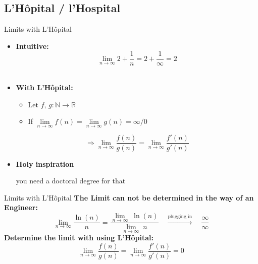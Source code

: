 \subsection{L'H\^{o}pital / l'Hospital}

\begin{frame}{Limits with L'H\^{o}pital}
  \begin{itemize}
    \item
      \textbf{Intuitive:}\\
      \begin{displaymath}
        \lim\limits_{n \rightarrow \infty} 2 + \dfrac{1}{n}
        = 2  + \dfrac{1}{\infty} = 2
      \end{displaymath}
      \vspace{0em}\\
    \item<2- |handout:1>
      \textbf{With L'H\^{o}pital:}
      \begin{itemize}
        \item
          Let $f, \, g : \mathbb{N} \rightarrow \mathbb{R}$
        \item
          If
          \begin{math}
            \lim\limits_{n \to \infty} f(n)
              = \lim\limits_{n \to \infty} g(n)
              = \infty / 0
          \end{math}
      \end{itemize}
      \begin{displaymath}
        \Rightarrow \lim\limits_{n \rightarrow \infty} \dfrac{f(n)}{g(n)}
          = \lim\limits_{n \rightarrow \infty} \dfrac{f'(n)}{g'(n)}
      \end{displaymath}
    \item<3- |handout:1>
      \textbf{Holy inspiration}
      \begin{center}
        you need a doctoral degree for that
      \end{center}
  \end{itemize}
\end{frame}


\begin{frame}{Limits with L'H\^{o}pital}
  \textbf{The Limit can not be determined in the way of an Engineer:}
  \begin{displaymath}
    \lim_{n \to \infty} \dfrac{\ln (n)}{n}
      = \dfrac{\lim_{n \to \infty}\; \ln (n)}{\lim\limits_{n \to \infty}\; n}
    \hspace{1em} \stackrel{\text{plugging in}}{\longrightarrow} \hspace{1em}
      \dfrac{\infty}{\infty}
  \end{displaymath}
  \textbf{Determine the limit with using L'H\^{o}pital:}
  \begin{displaymath}
    \lim\limits_{n \rightarrow \infty} \dfrac{f(n)}{g(n)}
      = \lim\limits_{n \rightarrow \infty} \dfrac{f'(n)}{g'(n)} = 0
  \end{displaymath}
\end{frame}

